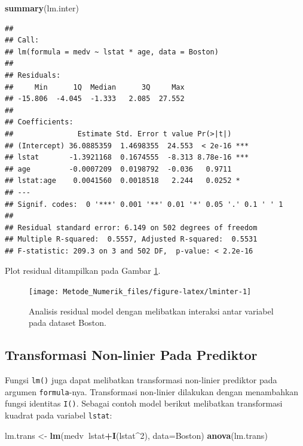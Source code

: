 \documentclass[]{book}
\newenvironment{Shaded}{\begin{snugshade}}{\end{snugshade}}
\newcommand{\DataTypeTok}[1]{\textcolor[rgb]{0.13,0.29,0.53}{#1}}
\newcommand{\DecValTok}[1]{\textcolor[rgb]{0.00,0.00,0.81}{#1}}
\newcommand{\KeywordTok}[1]{\textcolor[rgb]{0.13,0.29,0.53}{\textbf{#1}}}
\newcommand{\NormalTok}[1]{#1}
\newcommand{\OperatorTok}[1]{\textcolor[rgb]{0.81,0.36,0.00}{\textbf{#1}}}
\newcommand{\StringTok}[1]{\textcolor[rgb]{0.31,0.60,0.02}{#1}}
\theoremstyle{definition}
\theoremstyle{definition}
\theoremstyle{definition}
\theoremstyle{remark}
\begin{document}
\begin{Shaded}
\begin{Highlighting}[]
\KeywordTok{summary}\NormalTok{(lm.inter)}
\end{Highlighting}
\end{Shaded}

\begin{verbatim}
## 
## Call:
## lm(formula = medv ~ lstat * age, data = Boston)
## 
## Residuals:
##     Min      1Q  Median      3Q     Max 
## -15.806  -4.045  -1.333   2.085  27.552 
## 
## Coefficients:
##               Estimate Std. Error t value Pr(>|t|)    
## (Intercept) 36.0885359  1.4698355  24.553  < 2e-16 ***
## lstat       -1.3921168  0.1674555  -8.313 8.78e-16 ***
## age         -0.0007209  0.0198792  -0.036   0.9711    
## lstat:age    0.0041560  0.0018518   2.244   0.0252 *  
## ---
## Signif. codes:  0 '***' 0.001 '**' 0.01 '*' 0.05 '.' 0.1 ' ' 1
## 
## Residual standard error: 6.149 on 502 degrees of freedom
## Multiple R-squared:  0.5557, Adjusted R-squared:  0.5531 
## F-statistic: 209.3 on 3 and 502 DF,  p-value: < 2.2e-16
\end{verbatim}

Plot residual ditampilkan pada Gambar \ref{fig:lminter}.

\begin{figure}

{\centering \texttt{[image: Metode\_Numerik\_files/figure-latex/lminter-1]} 

}

\caption{Analisis residual model dengan melibatkan interaksi antar variabel pada dataset Boston.}\label{fig:lminter}
\end{figure}

\hypertarget{nlinpred}{%
\subsection{Transformasi Non-linier Pada Prediktor}\label{nlinpred}}

Fungsi \texttt{lm()} juga dapat melibatkan transformasi non-linier prediktor pada argumen \texttt{formula}-nya. Transformasi non-linier dilakukan dengan menambahkan fungsi identitas \texttt{I()}. Sebagai contoh model berikut melibatkan transformasi kuadrat pada variabel \texttt{lstat}:

\begin{Shaded}
\begin{Highlighting}[]
\NormalTok{lm.trans <-}\StringTok{ }\KeywordTok{lm}\NormalTok{(medv}\OperatorTok{~}\NormalTok{lstat}\OperatorTok{+}\KeywordTok{I}\NormalTok{(lstat}\OperatorTok{^}\DecValTok{2}\NormalTok{), }\DataTypeTok{data=}\NormalTok{Boston)}
\KeywordTok{anova}\NormalTok{(lm.trans)}
\end{Highlighting}
\end{Shaded}
\end{document}
